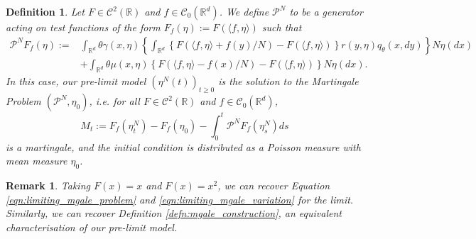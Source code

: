 \documentclass[12pt]{article}
\newtheorem{remark}[theorem]{Remark}
\newtheorem{definition}[theorem]{Definition}
\newcommand{\Pgen}{\mathcal{P}}    %
\begin{document}
\begin{definition}
    \label{def: MP definition of pre-limit}
Let $F \in \mathcal{C}^{2}(\mathbb{R})$ and $f \in \mathcal{C}_{0}(\mathbb{R}^d)$.
We define $\Pgen^N$ to be a generator
acting on test functions of the form
$F_f(\eta):=F (\langle f, \eta \rangle)$
such that 
\begin{equation}
\begin{aligned}
\Pgen^{N} F_f(\eta):=& \int_{\mathbb{R}^d} \theta\gamma(x, \eta) \left\{\int_{\mathbb{R}^d} \left\{F(\langle f, \eta \rangle + f(y)/N )-F(\langle f, \eta \rangle )\right\}r(y, \eta)q_{\theta}(x,dy)\right\}N\eta(dx)\\
&+\int_{\mathbb{R}^d} \theta \mu(x, \eta) \left\{F(\langle f, \eta \rangle - f(x)/N )-F(\langle f, \eta \rangle )\right\}N\eta(dx).
\end{aligned}    
\end{equation}
In this case, our pre-limit model $(\eta^{N}(t))_{t \geq 0}$ is the solution to the Martingale Problem $(\Pgen^{N}, \eta_0)$, i.e. 
for all $F \in \mathcal{C}^{2}(\mathbb{R})$
and $f \in \mathcal{C}_{0}(\mathbb{R}^d)$,
$$M_t:=F_f(\eta^{N}_t)-F_f(\eta_0)
-\int_{0}^{t}\Pgen^{N}F_f(\eta^{N}_s)ds$$
is a martingale, and the initial condition is distributed as a Poisson measure with mean measure $\eta_0$.
\end{definition}

\begin{remark}
Taking $F(x)=x$ and $F(x)=x^2$, we can recover Equation \eqref{eqn:limiting_mgale_problem} and \eqref{eqn:limiting_mgale_variation} for the limit.
Similarly, we can recover
Definition \ref{defn:mgale_construction},
an equivalent characterisation
of our pre-limit model.
\end{remark}
\end{document}

